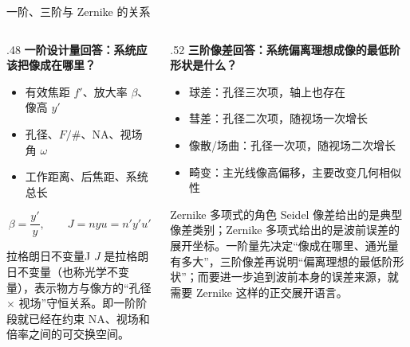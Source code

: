 \begin{frame}{一阶、三阶与 Zernike 的关系}
\label{1.2}
    \begin{columns}[T]
        \begin{column}{.48\textwidth}
            \textbf{一阶设计量回答：系统应该把像成在哪里？}
            \begin{itemize}
                \item 有效焦距 $f'$、放大率 $\beta$、像高 $y'$
                \item 孔径、$F/\#$、NA、视场角 $\omega$
                \item 工作距离、后焦距、系统总长
            \end{itemize}

            \begin{equation}
                \beta = \frac{y'}{y}, \qquad
                J = nyu = n'y'u'
                \label{eq:first_order_main}
            \end{equation}

            \begin{block}{拉格朗日不变量J}
                $J$ 是\alert{拉格朗日不变量}（也称光学不变量），表示物方与像方的“孔径 $\times$ 视场”守恒关系。即一阶阶段就已经在约束 NA、视场和倍率之间的可交换空间。
            \end{block}
        \end{column}
        \hfill
        \begin{column}{.52\textwidth}
            \textbf{三阶像差回答：系统偏离理想成像的最低阶形状是什么？}
            \begin{itemize}
                \item 球差：孔径三次项，轴上也存在
                \item 彗差：孔径二次项，随视场一次增长
                \item 像散/场曲：孔径一次项，随视场二次增长
                \item 畸变：主光线像高偏移，主要改变几何相似性
            \end{itemize}

            \begin{block}{Zernike 多项式的角色}
                Seidel 像差给出的是典型像差类别；Zernike 多项式给出的是波前误差的展开坐标。一阶量先决定“像成在哪里、通光量有多大”，三阶像差再说明“偏离理想的最低阶形状”；而要进一步追到\alert{波前本身的误差来源}，就需要 Zernike 这样的正交展开语言。
            \end{block}
        \end{column}
    \end{columns}
\end{frame}

